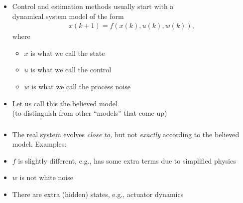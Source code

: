\documentclass[aspectratio=169,handout]{beamer} 	%
\begin{document}
\begin{frame}
	\frametitle{}
	\begin{itemize}[<+->]
		\itemsep\baselineskip
		\item Control and estimation methods usually start with a \\ dynamical system 
		model of the form
		\begin{align*}
			x(k + 1) = f( x(k), u(k), w(k) ),
		\end{align*}
		where%
		\begin{itemize}
			\item $x$ is what we call the {state}
			\item $u$ is what we call the {control}
			\item $w$ is what we call the {process noise}
		\end{itemize}
		
		\item Let us call this the \alert{believed model} \\
		(to distinguish from other ``models'' that come up)
		
	\end{itemize}
	
\end{frame}



\begin{frame}
	\frametitle{}
	\begin{itemize}[<+->]
		\itemsep\baselineskip
		\item The real system evolves \emph{close to,} 
		but not \emph{exactly} according to the believed model. Examples:
		
		\item $f$ is slightly different, e.g., has some extra terms 
		due to simplified physics
		
		\item $w$ is not white noise
		
		\item There are extra (hidden) states, e.g., actuator dynamics
		
		
	\end{itemize}
	
\end{frame}
\end{document}
